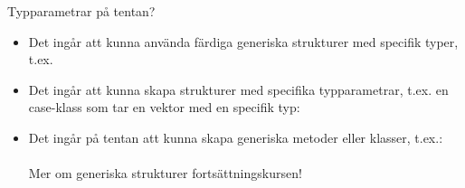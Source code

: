 \begin{Slide}{Typparametrar på tentan?}
\begin{itemize}
\item Det ingår att kunna använda färdiga generiska strukturer med specifik typer, t.ex. 

\item Det ingår att kunna skapa strukturer med specifika typparametrar, t.ex. en case-klass som tar en vektor med en specifik typ:\\



\item Det ingår  på tentan att kunna skapa generiska metoder eller klasser, t.ex.: \\
 \\
Mer om generiska strukturer fortsättningskursen!
\end{itemize}
\end{Slide}

\fi






